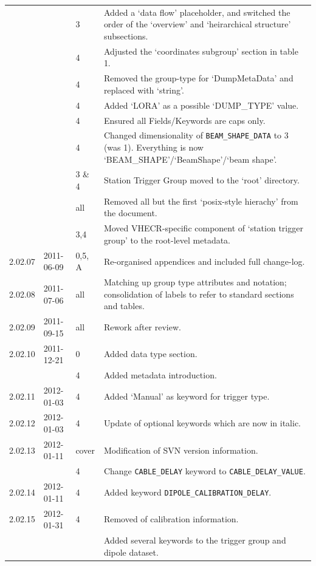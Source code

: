 \documentclass[a4paper,10pt,bibtotoc]{scrartcl}
\begin{document}
\begin{center}
\begin{supertabular}{lllp{9.5cm}}
    && 3 & Added a `data flow' placeholder, and switched the order of the `overview' and `heirarchical structure' subsections.\\
    && 4 & Adjusted the `coordinates subgroup' section in table 1.\\
    && 4 & Removed the group-type for `DumpMetaData' and replaced with `string'.\\
    && 4 & Added `LORA' as a possible `DUMP\_TYPE' value.\\
    && 4 & Ensured all Fields/Keywords are caps only.\\
    && 4 & Changed dimensionality of \verb|BEAM_SHAPE_DATA| to 3 (was 1). Everything is now `BEAM\_SHAPE'/`BeamShape'/`beam shape'.\\
    && 3 \& 4 & Station Trigger Group moved to the `root' directory.\\
    && all & Removed all but the first  `posix-style hierachy' from the document.\\
    && 3,4 & Moved VHECR-specific component of `station trigger group' to the root-level metadata.\\
    2.02.07 & 2011-06-09 & 0,5, A & Re-organised appendices and included full change-log.\\
    2.02.08 & 2011-07-06 & all & Matching up group type attributes and
    notation; consolidation of labels to refer to standard sections
    and tables. \\
    2.02.09 & 2011-09-15 & all & Rework after review.\\ %
    2.02.10 & 2011-12-21 & 0 & Added data type section.\\
            &            & 4 & Added metadata introduction.\\
    2.02.11 & 2012-01-03 & 4 & Added `Manual' as keyword for trigger
    type.\\
    2.02.12 & 2012-01-03 & 4 & Update of optional keywords which are
    now in italic.\\
    2.02.13 & 2012-01-11 & cover & Modification of SVN version information.\\
            &            & 4     & Change \verb|CABLE_DELAY| keyword
                                   to \verb|CABLE_DELAY_VALUE|.\\
    2.02.14 & 2012-01-11 & 4     & Added keyword \verb|DIPOLE_CALIBRATION_DELAY|.\\
    2.02.15 & 2012-01-31 & 4     & Removed of calibration information.\\
            &            &       & Added several keywords to the trigger group and dipole dataset.\\

\end{supertabular}
\end{center}
\end{document}
